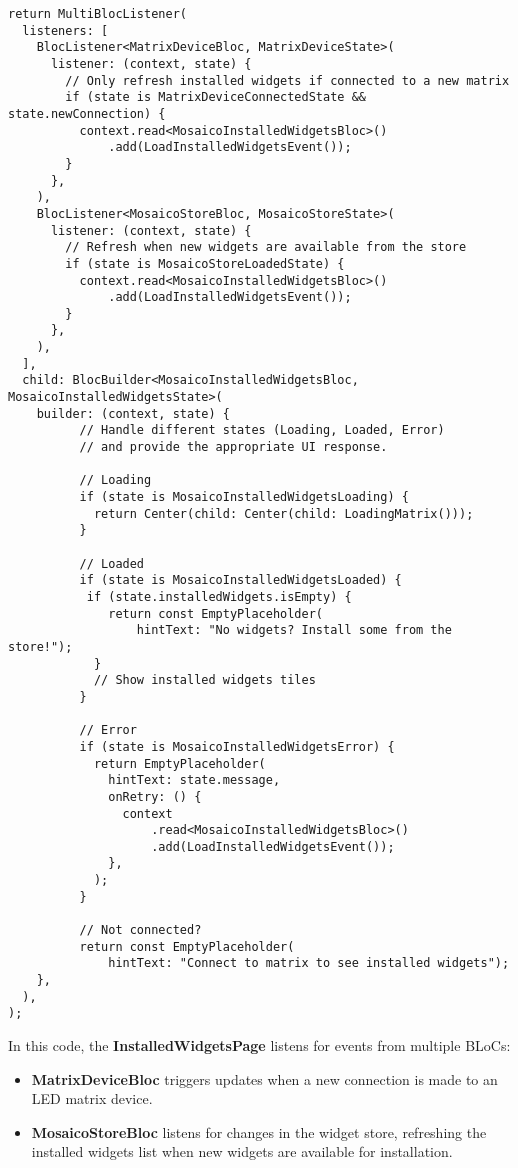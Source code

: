 \begin{verbatim}
return MultiBlocListener(
  listeners: [
    BlocListener<MatrixDeviceBloc, MatrixDeviceState>(
      listener: (context, state) {
        // Only refresh installed widgets if connected to a new matrix
        if (state is MatrixDeviceConnectedState && state.newConnection) {
          context.read<MosaicoInstalledWidgetsBloc>()
              .add(LoadInstalledWidgetsEvent());
        }
      },
    ),
    BlocListener<MosaicoStoreBloc, MosaicoStoreState>(
      listener: (context, state) {
        // Refresh when new widgets are available from the store
        if (state is MosaicoStoreLoadedState) {
          context.read<MosaicoInstalledWidgetsBloc>()
              .add(LoadInstalledWidgetsEvent());
        }
      },
    ),
  ],
  child: BlocBuilder<MosaicoInstalledWidgetsBloc, MosaicoInstalledWidgetsState>(
    builder: (context, state) {
          // Handle different states (Loading, Loaded, Error)
          // and provide the appropriate UI response.
          
          // Loading
          if (state is MosaicoInstalledWidgetsLoading) {
            return Center(child: Center(child: LoadingMatrix()));
          }

          // Loaded
          if (state is MosaicoInstalledWidgetsLoaded) {
           if (state.installedWidgets.isEmpty) {
              return const EmptyPlaceholder(
                  hintText: "No widgets? Install some from the store!");
            }
            // Show installed widgets tiles
          }

          // Error
          if (state is MosaicoInstalledWidgetsError) {
            return EmptyPlaceholder(
              hintText: state.message,
              onRetry: () {
                context
                    .read<MosaicoInstalledWidgetsBloc>()
                    .add(LoadInstalledWidgetsEvent());
              },
            );
          }

          // Not connected?
          return const EmptyPlaceholder(
              hintText: "Connect to matrix to see installed widgets");
    },
  ),
);
\end{verbatim}

In this code, the \textbf{InstalledWidgetsPage} listens for events from multiple BLoCs:

\begin{itemize}
    \item \textbf{MatrixDeviceBloc} triggers updates when a new connection is made to an LED matrix device.
    \item \textbf{MosaicoStoreBloc} listens for changes in the widget store, refreshing the installed widgets list when new widgets are available for installation.
\end{itemize}

